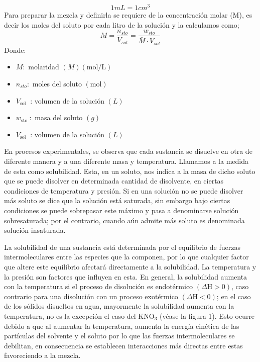 \documentclass[11pt]{scrartcl}
\begin{document}
\[
1mL=1cm^3
\]
Para preparar la mezcla y definirla se requiere de la concentración molar (M), es decir los moles del soluto por cada litro de la solución y la calculamos como;
\begin{equation}
M=\frac{n_{s t o}}{V_{s o l}}=\frac{w_{s t o}}{\bar{M} \cdot V_{s o l}}
\end{equation}
Donde:
\begin{itemize}
	\item $M:$ molaridad $(M)(\mathrm{mol} / \mathrm{L})$

	\item $n_{s t o}:$ moles del soluto $(\mathrm{mol})$

\item $V_{\text {sol }}$ : volumen de la solución $(L)$

\item $w_{\text {sto }}:$ masa del soluto $(g)$

\item $V_{\text {sol }}$ : volumen de la solución $(L)$
\end{itemize}
En procesos experimentales, se observa que cada sustancia se disuelve en otra de diferente manera y a una diferente masa y temperatura. Llamamos a la medida de esta como solubilidad. Esta, en un soluto, nos indica a la masa de dicho soluto que se puede disolver en determinada cantidad de disolvente, en ciertas condiciones de temperatura y presión. Si en una solución no se puede disolver más soluto se dice que la solución está saturada, sin embargo bajo ciertas condiciones se puede sobrepasar este máximo y pasa a denominarse solución sobresaturada; por el contrario, cuando aún admite más soluto es denominada solución insaturada.

La solubilidad de una sustancia está determinada por el equilibrio de fuerzas intermoleculares entre las especies que la componen, por lo que cualquier factor que altere este equilibrio afectará directamente a la solubilidad. La temperatura y la presión son factores que influyen en esta. En general, la solubilidad aumenta con la temperatura si el proceso de disolución es endotérmico $(\Delta \mathrm{H}>0)$, caso contrario para una disolución con un proceso exotérmico $(\Delta \mathrm{H}<0)$; en el caso de los sólidos disueltos en agua, mayormente la solubilidad aumenta con la temperatura, no es la excepción el caso del $\mathrm{KNO}_{3}$ (véase la figura 1). Esto ocurre debido a que al aumentar la temperatura, aumenta la energía cinética de las partículas del solvente y el soluto por lo que las fuerzas intermoleculares se debilitan, en consecuencia se establecen interacciones más directas entre estas favoreciendo a la mezcla.\cite{chang2005quimica}
\end{document}
